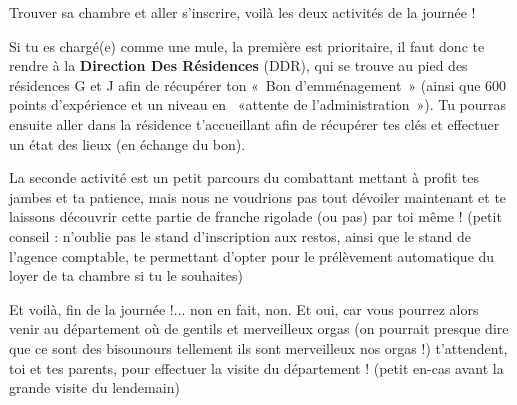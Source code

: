 Trouver sa chambre et aller s'inscrire, voilà les deux activités de la journée !

Si tu es chargé(e) comme une mule, la première est prioritaire, il faut donc te
rendre à la \textbf{Direction Des Résidences} (DDR), qui se trouve au pied des résidences
G et J afin de récupérer ton «~Bon d'emménagement~» (ainsi que 600 points
d'expérience et un niveau en ~«attente de l'administration~»).
Tu pourras ensuite aller dans la résidence t'accueillant afin de récupérer tes
clés et effectuer un état des lieux (en échange du bon).

La seconde activité est un petit parcours du combattant mettant à profit tes 
jambes et ta patience, mais nous ne voudrions pas tout dévoiler maintenant et
te laissons découvrir cette partie de franche rigolade (ou pas) par toi même !
(petit conseil : n'oublie pas le stand d'inscription aux restos, ainsi que le
 stand de l'agence comptable, te permettant d'opter pour le prélèvement
 automatique du loyer de ta chambre si tu le souhaites)

Et voilà, fin de la journée !... non en fait, non.
Et oui, car vous pourrez alors venir au département où de gentils et merveilleux
orgas (on pourrait presque dire que ce sont des bisounours tellement ils sont
merveilleux nos orgas !) t'attendent, toi et tes parents, pour effectuer
la visite du département ! (petit en-cas avant la grande visite du lendemain) 
